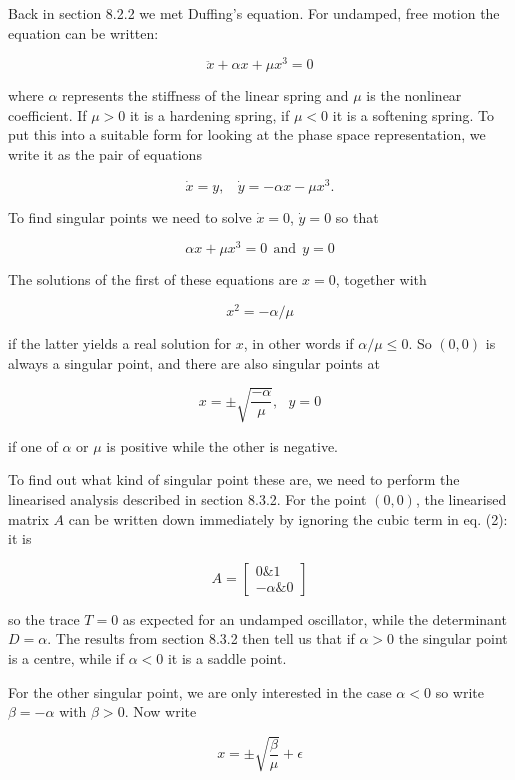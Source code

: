   Back in section 8.2.2 we met Duffing's equation. For undamped, free motion 
  the equation can be written: 

  $$\ddot{x} +\alpha x +\mu x^3 = 0 \tag{1}$$ 

  where $\alpha$ represents the stiffness of the linear spring and $\mu$ is the 
  nonlinear coefficient. If $\mu > 0$ it is a hardening spring, if $\mu < 0$ it 
  is a softening spring. To put this into a suitable form for looking at the 
  phase space representation, we write it as the pair of equations 

  $$\dot{x}=y \mathrm{,~~~~}\dot{y}=-\alpha x -\mu x^3 . \tag{2}$$ 

  To find singular points we need to solve $\dot{x}=0$, $\dot{y}=0$ so that 

  $$\alpha x +\mu x^3 = 0 \mathrm{~~and~~} y=0 \tag{3}$$ 

  The solutions of the first of these equations are $x=0$, together with 

  $$x^2=-\alpha / \mu \tag{4}$$ 

  if the latter yields a real solution for $x$, in other words if $\alpha / \mu 
  \le 0$. So $(0,0)$ is always a singular point, and there are also singular 
  points at 

  $$x=\pm \sqrt{\dfrac{-\alpha}{\mu}} \mathrm{,~~~} y=0 \tag{5}$$ 

  if one of $\alpha$ or $\mu$ is positive while the other is negative. 

  To find out what kind of singular point these are, we need to perform the 
  linearised analysis described in section 8.3.2. For the point $(0,0)$, the 
  linearised matrix $A$ can be written down immediately by ignoring the cubic 
  term in eq. (2): it is 

  $$A=\begin{bmatrix}0 \& 1\\ -\alpha \& 0\end{bmatrix} \tag{6}$$ 

  so the trace $T=0$ as expected for an undamped oscillator, while the 
  determinant $D=\alpha$. The results from section 8.3.2 then tell us that if 
  $\alpha > 0$ the singular point is a centre, while if $\alpha < 0$ it is a 
  saddle point. 

  For the other singular point, we are only interested in the case $\alpha < 0$ 
  so write $\beta = -\alpha$ with $\beta > 0$. Now write 

  $$x=\pm \sqrt{\dfrac{\beta}{\mu}} + \epsilon \tag{7}$$ 

